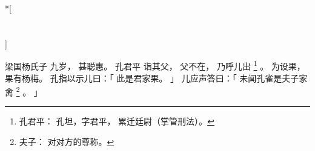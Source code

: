 
\switchcolumn[0]*[\section{}]

梁国杨氏子
九岁，
甚聪惠。
孔君平
诣其父，
父不在，
乃呼儿出%
\footnote{%
    孔君平：
        孔坦，字君平，
        累迁廷尉（掌管刑法）。
}%
。
为设果，
果有杨梅。
孔指以示儿曰：「
    此是君家果。
」
儿应声答曰：「
    未闻孔雀是夫子家禽%
    \footnote{%
        夫子：
            对对方的尊称。
    }%
    。
」

\switchcolumn


